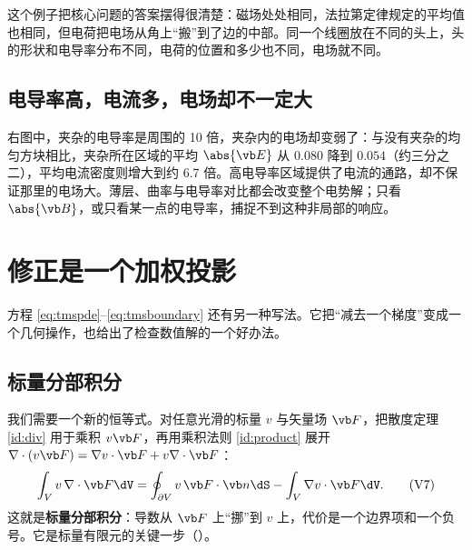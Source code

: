 这个例子把核心问题的答案摆得很清楚：磁场处处相同，法拉第定律规定的平均值也相同，但电荷把电场从角上“搬”到了边的中部。同一个线圈放在不同的头上，头的形状和电导率分布不同，电荷的位置和多少也不同，电场就不同。

\subsection{电导率高，电流多，电场却不一定大}
 右图中，夹杂的电导率是周围的 10 倍，夹杂内的电场却变弱了：与没有夹杂的均匀方块相比，夹杂所在区域的平均 $\abs{\vb E}$ 从 $0.080$ 降到 $0.054$（约三分之二），平均电流密度则增大到约 6.7 倍。高电导率区域提供了电流的通路，却不保证那里的电场大。薄层、曲率与电导率对比都会改变整个电势解；只看 $\abs{\vb B}$，或只看某一点的电导率，捕捉不到这种非局部的响应。

\section{修正是一个加权投影}\label{sec:tms-projection}

方程 \eqref{eq:tmspde}–\eqref{eq:tmsboundary} 还有另一种写法。它把“减去一个梯度”变成一个几何操作，也给出了检查数值解的一个好办法。

\subsection{标量分部积分}
我们需要一个新的恒等式。对任意光滑的标量 $v$ 与矢量场 $\vb F$，把散度定理 \eqref{id:div} 用于乘积 $v\vb F$，再用乘积法则 \eqref{id:product} 展开 $\nabla\cdot(v\vb F)=\nabla v\cdot\vb F+v\nabla\cdot\vb F$：
\begin{equation}
\int_Vv\,\nabla\cdot\vb F\dV=\oint_{\partial V}v\,\vb F\cdot\vb n\dS-\int_V\nabla v\cdot\vb F\dV .
\tag{V7}\label{id:scalaribp}
\end{equation}
这就是\textbf{标量分部积分}：导数从 $\vb F$ 上“挪”到 $v$ 上，代价是一个边界项和一个负号。它是标量有限元的关键一步（）。

